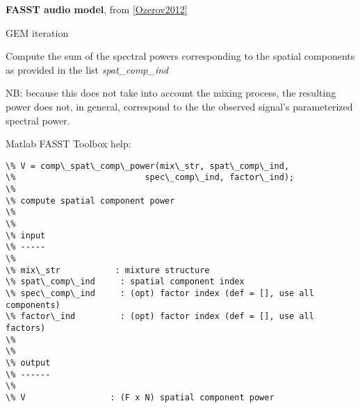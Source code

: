 \documentclass[letterpaper,10pt,english]{sphinxmanual}
\begin{document}
\begin{fulllineitems}
\label{reference/audiomodel:pyfasst.audioModel.FASST}
\textbf{FASST audio model}, from {\hyperref[description:ozerov2012]{{[}Ozerov2012{]}}}

\begin{fulllineitems}
\label{reference/audiomodel:pyfasst.audioModel.FASST.GEM_iteration}
GEM iteration

\end{fulllineitems}


\begin{fulllineitems}
\label{reference/audiomodel:pyfasst.audioModel.FASST.comp_spat_cmps_powers}
Compute the sum of the spectral powers corresponding to the
spatial components as provided in the list \emph{spat\_comp\_ind}

NB: because this does not take into account the mixing process,
the resulting power does not, in general, correspond to the
the observed signal's parameterized spectral power.

\end{fulllineitems}


\begin{fulllineitems}
\label{reference/audiomodel:pyfasst.audioModel.FASST.comp_spat_comp_power}
Matlab FASST Toolbox help:

\begin{Verbatim}[commandchars=\\\{\}]
\% V = comp\_spat\_comp\_power(mix\_str, spat\_comp\_ind,                  
\%                          spec\_comp\_ind, factor\_ind);            
\%
\% compute spatial component power
\%
\%
\% input
\% -----
\%
\% mix\_str           : mixture structure
\% spat\_comp\_ind     : spatial component index
\% spec\_comp\_ind     : (opt) factor index (def = [], use all components)
\% factor\_ind         : (opt) factor index (def = [], use all factors)
\% 
\%
\% output
\% ------
\%
\% V                 : (F x N) spatial component power
\end{Verbatim}


\end{fulllineitems}
\end{fulllineitems}
\end{document}
